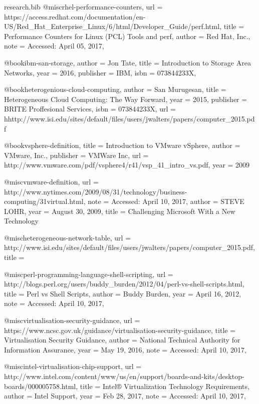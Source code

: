 \documentclass{article}
\begin{document}
\begin{filecontents*}{research.bib}
    @misc{rhel-performance-counters,
        url = {https://access.redhat.com/documentation/en-US/Red_Hat_Enterprise_Linux/6/html/Developer_Guide/perf.html},
        title = {Performance Counters for Linux (PCL) Tools and perf},
        author = {Red Hat, Inc.},
        note = {Accessed: April 05, 2017},
    }

    @book{ibm-san-storage,
        author    = {Jon Tate},
        title     = {Introduction to Storage Area Networks},
        year      = {2016},
        publisher = {IBM},
        isbn      =  {073844233X},
    }

    @book{heterogenious-cloud-computing,
        author    = {San Murugesan},
        title     = {Heterogeneous Cloud Computing: The Way Forward},
        year      = {2015},
        publisher = {BRITE Proffesional Services},
        isbn      =  {073844233X},
        url = {hhttp://www.isi.edu/sites/default/files/users/jwalters/papers/computer_2015.pdf}
    }

    @book{vsphere-definition,
        title = {Introduction to VMware vSphere},
        author = {VMware, Inc.},
		publisher = {VMWare Inc},
		url = {http://www.vmware.com/pdf/vsphere4/r41/vsp_41_intro_vs.pdf},
        year = {2009}
    }

    @misc{vmware-definition,
        url = {http://www.nytimes.com/2009/08/31/technology/business-computing/31virtual.html},
        note = {Accessed: April 10, 2017},
        author = {STEVE LOHR},
        year = {August 30, 2009},
        title = {Challenging Microsoft With a New Technology}
    }

    @misc{heterogeneous-network-table,
        url = {http://www.isi.edu/sites/default/files/users/jwalters/papers/computer_2015.pdf},
        title = {}
    }

    @misc{perl-programming-language-shell-scripting,
        url = {http://blogs.perl.org/users/buddy_burden/2012/04/perl-vs-shell-scripts.html},
        title = {Perl vs Shell Scripts},
        author = {Buddy Burden},
        year = {April 16, 2012},
        note = {Accessed: April 10, 2017},
    }

	@misc{virtualisation-security-guidance,
	    url = {https://www.ncsc.gov.uk/guidance/virtualisation-security-guidance},
		title = {Virtualisation Security Guidance},
		author = {National Technical Authority for Information Assurance},
		year = {May 19, 2016},
		note = {Accessed: April 10, 2017},
	}

	@misc{intel-virtualisation-chip-support,
		url = {http://www.intel.com/content/www/us/en/support/boards-and-kits/desktop-boards/000005758.html},
		title = { Intel® Virtualization Technology Requirements},
		author = {Intel Support},
		year = {Feb 28, 2017},
		note = {Accessed: April 10, 2017},
	}


\end{filecontents*}
\end{document}
